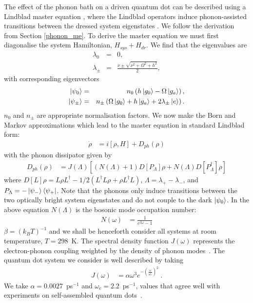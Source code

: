 The effect of the phonon bath on a driven quantum dot can be described using a Lindblad master equation \cite{gauger:2008}, where the Lindblad operators  induce phonon-assisted transitions between the dressed system eigenstates \cite{gauger:2010}. We follow the derivation from Section \ref{phonon_me}. To derive the master equation we must first diagonalise the system Hamiltonian, $H_{sys} + H_{dr}$. We find that the eigenvalues are
\begin{eqnarray}
 \lambda_0 &=& 0 \nonumber, \\
 \lambda_\pm &=& \frac{\nu \pm \sqrt{\nu^2 + \Omega^2 + h^2}}{2},
\end{eqnarray}
with corresponding eigenvectors
\begin{eqnarray}
  \left\vert\psi_0\right\rangle &=& n_0 \left(h\left\vert g_0\right\rangle - \Omega\left\vert g_a\right\rangle\right), \nonumber \\
  \left\vert\psi_\pm\right\rangle &=& n_\pm \left( \Omega\left\vert g_0\right\rangle + h\left\vert g_a\right\rangle +2\lambda_\pm \left\vert e\right\rangle \right).
\end{eqnarray}
$n_0$ and $n_\pm$ are appropriate normalisation factors. We now make the Born and Markov approximations which lead to the master equation \cite{breuer02} in standard Lindblad form:
\begin{eqnarray}
  \dot{\rho} &= i\left[ \rho, H \right] + D_{ph}(\rho)
\end{eqnarray}
with the phonon dissipator given by
\begin{eqnarray}
  D_{ph}(\rho)  &= J(\Lambda) \left[ \left( N(\Lambda)+1 \right)D\left[ P_\Lambda \right] \rho + N(\Lambda)D[P_\Lambda^\dagger] \rho \right] 
  \label{eqn:phonondiss}
\end{eqnarray}
where $D[L]\rho = L\rho L^\dagger - 1/2(L^\dagger L\rho + \rho L^\dagger L)$, $\Lambda = \lambda_+ - \lambda_- $, and $P_\Lambda = -\left\vert \psi_- \right\rangle \left\langle \psi_+ \right\vert$. Note that the phonons only induce transitions between the two optically bright system eigenstates and do not couple to the dark $\left\vert\psi_0\right\rangle$. In the above equation $N(\Lambda)$ is the bosonic mode occupation number:
\begin{eqnarray}
  N(\omega) &= \frac{1}{e^{\beta \omega}-1}
\end{eqnarray}
$\beta = (k_BT)^{-1}$ and we shall be henceforth consider all systems at room temperature, $T = 298$~K. The spectral density function $J(\omega)$ represents the electron-phonon coupling weighted by the density of phonon modes~\cite{breuer02}. The quantum dot system we consider is well described by taking~\cite{gauger:2008}
\begin{eqnarray}
  J(\omega) &= \alpha \omega^3 e^{-\left(\frac{\omega}{\omega_c}\right)^2}~.
  \label{eq:specdens}
\end{eqnarray}
We take $\alpha = 0.0027$~ps$^{-1}$ and $\omega_c = 2.2$~ps$^{-1}$, values that agree well with experiments on self-assembled quantum dots~\cite{ramsay:2010, ramsay2:2010}.

